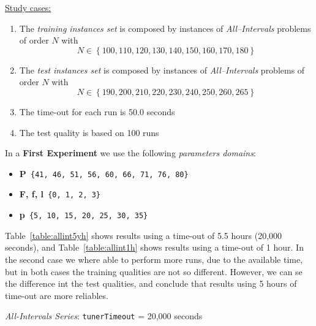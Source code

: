 \underline{Study cases:}
\begin{enumerate}
	\item The {\it training instances set} is composed by instances of {\it All--Intervals} problems of order $N$ with $$N \in \left\{100, 110, 120, 130, 140, 150, 160, 170, 180\right\}$$
	\item The {\it test instances set} is composed by instances of {\it All--Intervals} problems of order $N$ with $$N \in \left\{190, 200, 210, 220, 230, 240, 250, 260, 265\right\}$$
	\item The time-out for each run is 50.0 seconds
	\item The test quality is based on 100 runs
\end{enumerate}

In a {\bf First Experiment} we use the following {\it parameters domains}:
\begin{itemize}[itemsep=0.2mm]
	\item {\bf P}\texttt{ \{41, 46, 51, 56, 60, 66, 71, 76, 80\}}
	\item {\bf F, f, l}\texttt{ \{0, 1, 2, 3\}}
	\item {\bf p}\texttt{ \{5, 10, 15, 20, 25, 30, 35\}}
\end{itemize}

Table~\ref{table:allint5yh} shows results using a time-out of 5.5 hours (20,000 seconds), and Table~\ref{table:allint1h} shows results using a time-out of 1 hour. In the second case we where able to perform more runs, due to the available time, but in both cases the training qualities are not so different. However, we can se the difference int the test qualities, and conclude that results using 5 hours of time-out are more reliables. 

\begin{table}[h] 	
\centering 
\renewcommand{\arraystretch}{1.2}
\caption{{\it All-Intervals Series}: \texttt{tunerTimeout} = 20,000 seconds}\label{table:allint5yh}
\end{table}

